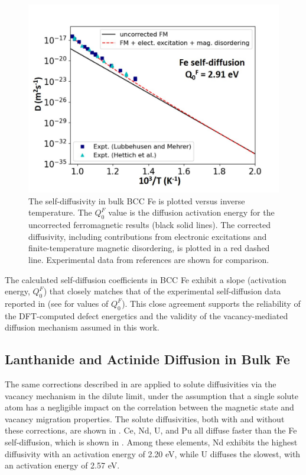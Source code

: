 \documentclass[preprint,12pt]{elsarticle}
\begin{document}
\begin{figure}[!ht]
    \centering
    \includegraphics[width=0.8\linewidth]{self_diffusivity.jpg}
    \caption{The self-diffusivity in bulk BCC Fe is plotted versus inverse temperature. The $Q_0^F$ value is the diffusion activation energy for the uncorrected ferromagnetic results (black solid lines). The corrected diffusivity, including contributions from electronic excitations and finite-temperature magnetic disordering, is plotted in a red dashed line. Experimental data from references \cite{lubbehusen1990self, hettich1977self} are shown for comparison.}
    \label{fig:self_diff}
\end{figure}

The calculated self-diffusion coefficients in BCC Fe exhibit a slope (activation energy, $Q_0^F$) that closely matches that of the experimental self-diffusion data reported in \cite{lubbehusen1990self, hettich1977self} (see  for values of $Q_0^F$). This close agreement supports the reliability of the DFT-computed defect energetics and the validity of the vacancy-mediated diffusion mechanism assumed in this work.

\subsection{Lanthanide and Actinide Diffusion in Bulk Fe}

The same corrections described in  are applied to solute diffusivities via the vacancy mechanism in the dilute limit, under the assumption that a single solute atom has a negligible impact on the correlation between the magnetic state and vacancy migration properties. The solute diffusivities, both with and without these corrections, are shown in . Ce, Nd, U, and Pu all diffuse faster than the Fe self-diffusion, which is shown in . Among these elements, Nd exhibits the highest diffusivity with an activation energy of 2.20 eV, while U diffuses the slowest, with an activation energy of 2.57 eV. 
\end{document}
